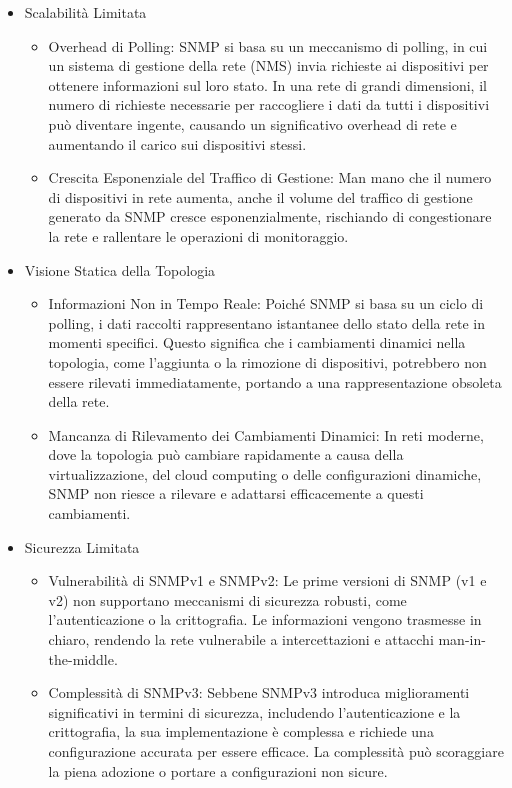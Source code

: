 \documentclass[target=bach,aauheader=,style=]{thud}
\begin{document}
\begin{itemize}

  \item Scalabilità Limitata
    \begin{itemize}
      \item Overhead di Polling: SNMP si basa su un meccanismo di polling, in cui un sistema di gestione della rete (NMS) invia richieste ai dispositivi per ottenere informazioni sul loro stato. In una rete di grandi dimensioni, il numero di richieste necessarie per raccogliere i dati da tutti i dispositivi può diventare ingente, causando un significativo overhead di rete e aumentando il carico sui dispositivi stessi.
      \item Crescita Esponenziale del Traffico di Gestione: Man mano che il numero di dispositivi in rete aumenta, anche il volume del traffico di gestione generato da SNMP cresce esponenzialmente, rischiando di congestionare la rete e rallentare le operazioni di monitoraggio.
    \end{itemize}

  \item Visione Statica della Topologia
  \begin{itemize}
      \item Informazioni Non in Tempo Reale: Poiché SNMP si basa su un ciclo di polling, i dati raccolti rappresentano istantanee dello stato della rete in momenti specifici. Questo significa che i cambiamenti dinamici nella topologia, come l'aggiunta o la rimozione di dispositivi, potrebbero non essere rilevati immediatamente, portando a una rappresentazione obsoleta della rete.
      \item Mancanza di Rilevamento dei Cambiamenti Dinamici: In reti moderne, dove la topologia può cambiare rapidamente a causa della virtualizzazione, del cloud computing o delle configurazioni dinamiche, SNMP non riesce a rilevare e adattarsi efficacemente a questi cambiamenti.
  \end{itemize}


  \item Sicurezza Limitata
    \begin{itemize}
      \item Vulnerabilità di SNMPv1 e SNMPv2: Le prime versioni di SNMP (v1 e v2) non supportano meccanismi di sicurezza robusti, come l'autenticazione o la crittografia. Le informazioni vengono trasmesse in chiaro, rendendo la rete vulnerabile a intercettazioni e attacchi man-in-the-middle.
      \item Complessità di SNMPv3: Sebbene SNMPv3 introduca miglioramenti significativi in termini di sicurezza, includendo l'autenticazione e la crittografia, la sua implementazione è complessa e richiede una configurazione accurata per essere efficace. La complessità può scoraggiare la piena adozione o portare a configurazioni non sicure.
    \end{itemize}


\end{itemize}
\end{document}
